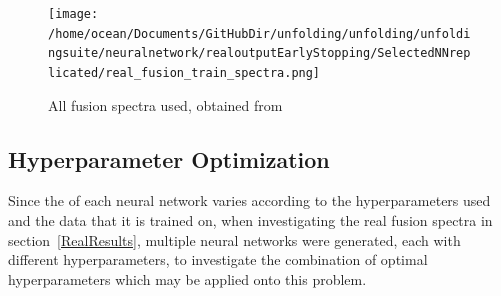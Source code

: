 \documentclass[a4paper, 12pt]{article}
\begin{document}
\begin{figure}
\centering
\texttt{[image: /home/ocean/Documents/GitHubDir/unfolding/unfolding/unfoldingsuite/neuralnetwork/realoutputEarlyStopping/SelectedNNreplicated/real\_fusion\_train\_spectra.png]}
\caption{All fusion spectra used, obtained from \cite{IAEAUKAEACompendium}}\label{RealFusionTrain}
\end{figure}

\subsection{Hyperparameter Optimization}
Since the of each neural network varies according to the hyperparameters used and the data that it is trained on, when investigating the real fusion spectra in section~\ref{RealResults}, multiple neural networks were generated, each with different hyperparameters, to investigate the combination of optimal hyperparameters which may be applied onto this problem.
\end{document}
